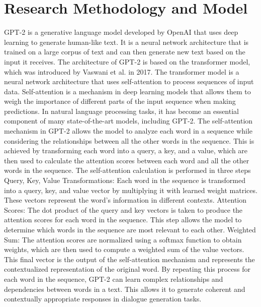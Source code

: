 \documentclass[12pt]{IEEEtran}
\begin{document}
\section{Research Methodology and Model}
GPT-2 is a generative language model developed by OpenAI that uses deep learning to generate human-like text. It is a neural network architecture that is trained on a large corpus of text and can then generate new text based on the input it receives. The architecture of GPT-2 is based on the transformer model, which was introduced by Vaswani et al. in 2017. The transformer model is a neural network architecture that uses self-attention to process sequences of input data. Self-attention is a mechanism in deep learning models that allows them to weigh the importance of different parts of the input sequence when making predictions. In natural language processing tasks, it has become an essential component of many state-of-the-art models, including GPT-2.
The self-attention mechanism in GPT-2 allows the model to analyze each word in a sequence while considering the relationships between all the other words in the sequence. This is achieved by transforming each word into a query, a key, and a value, which are then used to calculate the attention scores between each word and all the other words in the sequence.
The self-attention calculation is performed in three steps
Query, Key, Value Transformations: Each word in the sequence is transformed into a query, key, and value vector by multiplying it with learned weight matrices. These vectors represent the word's information in different contexts.
Attention Scores: The dot product of the query and key vectors is taken to produce the attention scores for each word in the sequence. This step allows the model to determine which words in the sequence are most relevant to each other.
Weighted Sum: The attention scores are normalized using a softmax function to obtain weights, which are then used to compute a weighted sum of the value vectors. This final vector is the output of the self-attention mechanism and represents the contextualized representation of the original word.
By repeating this process for each word in the sequence, GPT-2 can learn complex relationships and dependencies between words in a text. This allows it to generate coherent and contextually appropriate responses in dialogue generation tasks.
\end{document}
